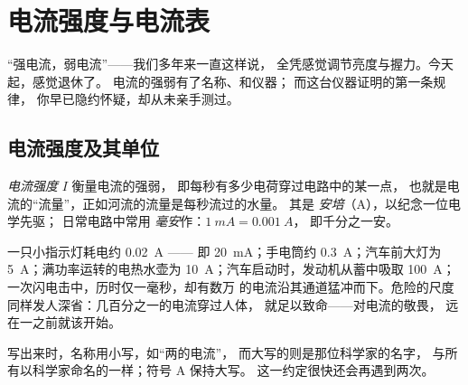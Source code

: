 \chapter{电流强度与电流表}\label{ch:g8:intensity-ammeter}

“强电流，弱电流”——我们多年来一直这样说，
全凭感觉调节亮度与握力。今天起，感觉退休了。
电流的强弱有了名称、和仪器；
而这台仪器证明的第一条规律，
你早已隐约怀疑，却从未亲手测过。

\section{电流强度及其单位}

\begin{definition}[电流强度]\label{def:g8:intensity-ammeter:intensity}
\emph{电流强度} $I$ 衡量电流的强弱，
即每秒有多少电荷穿过电路中的某一点，
也就是电流的“流量”，正如河流的流量是每秒流过的水量。
其是
\emph{安培}（\unit{A}），以纪念一位电学先驱；
日常电路中常用
\emph{毫安}作：$\qty{1}{mA} = \qty{0.001}{A}$，
即千分之一安。
\end{definition}

\begin{example}[常见电流的大小]\label{ex:g8:intensity-ammeter:values}
一只小指示灯耗电约 \qty{0.02}{A} ——
即 \qty{20}{mA}；手电筒约 \qty{0.3}{A}；汽车前大灯为
\qty{5}{A}；满功率运转的电热水壶为
\qty{10}{A}；汽车启动时，发动机从蓄中吸取 \qty{100}{A}；
一次闪电击中，历时仅一毫秒，却有数万
的电流沿其通道猛冲而下。危险的尺度
同样发人深省：几百分之一的电流穿过人体，
就足以致命——对电流的敬畏，
远在一之前就该开始。
\end{example}

\begin{remark}[人名与单位]\label{rem:g8:intensity-ammeter:person}
写出来时，名称用小写，如“两的电流”，
而大写的则是那位科学家的名字，
与所有以科学家命名的一样；符号 \unit{A} 保持大写。
这一约定很快还会再遇到两次。
\end{remark}

